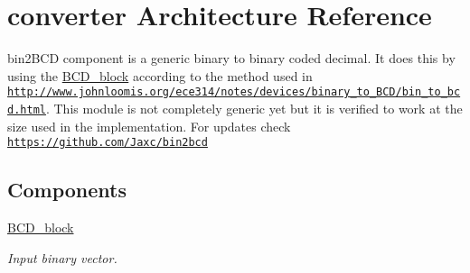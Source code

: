 \hypertarget{classbin2bcd_1_1converter}{\section{converter Architecture Reference}
\label{classbin2bcd_1_1converter}
}


bin2\-B\-C\-D  component is a generic binary to binary coded decimal. It does this by using the \hyperlink{classBCD__block}{B\-C\-D\-\_\-block} according to the method used in \href{http://www.johnloomis.org/ece314/notes/devices/binary_to_BCD/bin_to_bcd.html}{\tt http\-://www.\-johnloomis.\-org/ece314/notes/devices/binary\-\_\-to\-\_\-\-B\-C\-D/bin\-\_\-to\-\_\-bcd.\-html}. This module is not completely generic yet but it is verified to work at the size used in the implementation. For updates check \href{https://github.com/Jaxc/bin2bcd}{\tt https\-://github.\-com/\-Jaxc/bin2bcd}  


\subsection*{Components}
 \begin{DoxyCompactItemize}
\item 
\hypertarget{classbin2bcd_1_1converter_a357931df7e16eeffe2988c1e4f48a75f}{\hyperlink{classbin2bcd_1_1converter_a357931df7e16eeffe2988c1e4f48a75f}{B\-C\-D\-\_\-block}  {\bfseries }  }\label{classbin2bcd_1_1converter_a357931df7e16eeffe2988c1e4f48a75f}

\begin{DoxyCompactList}\small\item\em Input binary vector. \end{DoxyCompactList}\end{DoxyCompactItemize}
